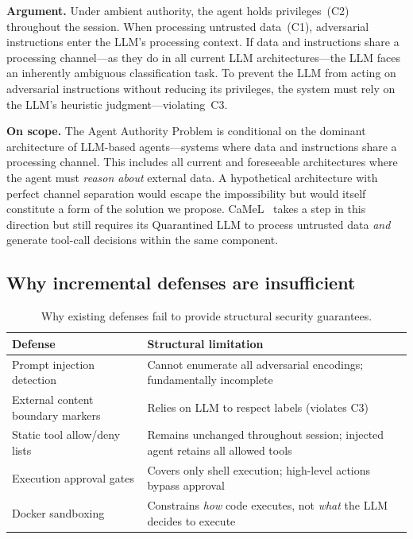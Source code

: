 \documentclass[pdflatex,sn-nature]{sn-jnl}%
\theoremstyle{thmstyleone}%
\theoremstyle{thmstyletwo}%
\theoremstyle{thmstylethree}%
\begin{document}
\textbf{Argument.} Under ambient authority, the agent holds privileges~(C2) throughout the session. When processing untrusted data~(C1), adversarial instructions enter the LLM's processing context. If data and instructions share a processing channel---as they do in all current LLM architectures---the LLM faces an inherently ambiguous classification task. To prevent the LLM from acting on adversarial instructions without reducing its privileges, the system must rely on the LLM's heuristic judgment---violating~C3.

\textbf{On scope.} The Agent Authority Problem is conditional on the dominant architecture of LLM-based agents---systems where data and instructions share a processing channel. This includes all current and foreseeable architectures where the agent must \emph{reason about} external data. A hypothetical architecture with perfect channel separation would escape the impossibility but would itself constitute a form of the solution we propose. CaMeL~\cite{debenedetti2025camel} takes a step in this direction but still requires its Quarantined LLM to process untrusted data \emph{and} generate tool-call decisions within the same component.

\subsection{Why incremental defenses are insufficient}\label{subsec:defenses}

\begin{table}[ht]
\caption{Why existing defenses fail to provide structural security guarantees.}\label{tab:defenses}
\begin{tabular}{@{}p{4cm}p{8cm}@{}}
\toprule
Defense & Structural limitation \\
\midrule
Prompt injection detection & Cannot enumerate all adversarial encodings; fundamentally incomplete \\
External content boundary markers & Relies on LLM to respect labels (violates C3) \\
Static tool allow/deny lists & Remains unchanged throughout session; injected agent retains all allowed tools \\
Execution approval gates & Covers only shell execution; high-level actions bypass approval \\
Docker sandboxing & Constrains \emph{how} code executes, not \emph{what} the LLM decides to execute \\
\bottomrule
\end{tabular}
\end{table}
\end{document}
